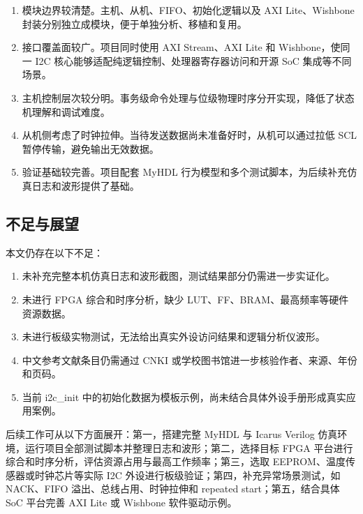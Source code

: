 \documentclass[12pt,a4paper]{article}
\numberwithin{equation}{section}
\providecommand{\tightlist}{%
  \setlength{\itemsep}{0pt}\setlength{\parskip}{0pt}}
\begin{document}
\begin{enumerate}
\def\labelenumi{\arabic{enumi}.}
\tightlist
\item
  模块边界较清楚。主机、从机、FIFO、初始化逻辑以及 AXI Lite、Wishbone
  封装分别独立成模块，便于单独分析、移植和复用。
\item
  接口覆盖面较广。项目同时使用 AXI Stream、AXI Lite 和 Wishbone，使同一
  I2C 核心能够适配纯逻辑控制、处理器寄存器访问和开源 SoC
  集成等不同场景。
\item
  主机控制层次较分明。事务级命令处理与位级物理时序分开实现，降低了状态机理解和调试难度。
\item
  从机侧考虑了时钟拉伸。当待发送数据尚未准备好时，从机可以通过拉低 SCL
  暂停传输，避免输出无效数据。
\item
  验证基础较完善。项目配套 MyHDL
  行为模型和多个测试脚本，为后续补充仿真日志和波形提供了基础。
\end{enumerate}

\subsection{不足与展望}\label{ux4e0dux8db3ux4e0eux5c55ux671b}

本文仍存在以下不足：

\begin{enumerate}
\def\labelenumi{\arabic{enumi}.}
\tightlist
\item
  未补充完整本机仿真日志和波形截图，测试结果部分仍需进一步实证化。
\item
  未进行 FPGA 综合和时序分析，缺少
  LUT、FF、BRAM、最高频率等硬件资源数据。
\item
  未进行板级实物测试，无法给出真实外设访问结果和逻辑分析仪波形。
\item
  中文参考文献条目仍需通过 CNKI
  或学校图书馆进一步核验作者、来源、年份和页码。
\item
  当前 i2c\_init
  中的初始化数据为模板示例，尚未结合具体外设手册形成真实应用案例。
\end{enumerate}

后续工作可从以下方面展开：第一，搭建完整 MyHDL 与 Icarus Verilog
仿真环境，运行项目全部测试脚本并整理日志和波形；第二，选择目标 FPGA
平台进行综合和时序分析，评估资源占用与最高工作频率；第三，选取
EEPROM、温度传感器或时钟芯片等实际 I2C
外设进行板级验证；第四，补充异常场景测试，如 NACK、FIFO
溢出、总线占用、时钟拉伸和 repeated start；第五，结合具体 SoC 平台完善
AXI Lite 或 Wishbone 软件驱动示例。

\clearpage
{}
{}
\end{document}
